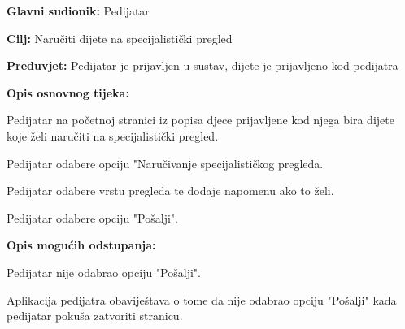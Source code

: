					\noindent {}
					\begin{packed_item}
						
						\item \textbf{Glavni sudionik: }Pedijatar
						\item  \textbf{Cilj:} Naručiti dijete na specijalistički pregled
						\item  \textbf{Preduvjet:} Pedijatar je prijavljen u sustav, dijete je prijavljeno kod pedijatra
						\item  \textbf{Opis osnovnog tijeka:}
						
						\item[] \begin{packed_enum}
							
							\item Pedijatar na početnoj stranici iz popisa djece prijavljene kod njega bira dijete koje želi naručiti na specijalistički pregled.
							\item Pedijatar odabere opciju "Naručivanje specijalističkog pregleda.
							\item Pedijatar odabere vrstu pregleda te dodaje napomenu ako to želi.
							\item Pedijatar odabere opciju "Pošalji".
						\end{packed_enum}
						
						\item  \textbf{Opis mogućih odstupanja:}
						
						\item[] \begin{packed_item}
							
							\item[4.a] Pedijatar nije odabrao opciju "Pošalji".
							\item[] \begin{packed_enum}
								
								\item Aplikacija pedijatra obaviještava o tome da nije odabrao opciju "Pošalji" kada pedijatar pokuša zatvoriti stranicu.
							\end{packed_enum}
							
							
						\end{packed_item}
						
						
					\end{packed_item}
					
